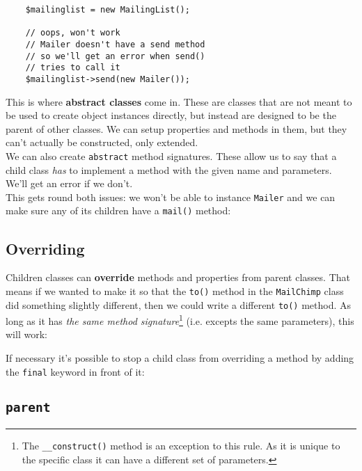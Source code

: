 \begin{verbatim}
    $mailinglist = new MailingList();

    // oops, won't work
    // Mailer doesn't have a send method
    // so we'll get an error when send()
    // tries to call it
    $mailinglist->send(new Mailer());
\end{verbatim}


This is where \textbf{abstract classes} come in. These are classes that are not meant to be used to create object instances directly, but instead are designed to be the parent of other classes. We can setup properties and methods in them, but they can't actually be constructed, only extended.
\\

We can also create \texttt{abstract} method signatures. These allow us to say that a child class \textit{has} to implement a method with the given name and parameters. We'll get an error if we don't.
\\

This gets round both issues: we won't be able to instance \texttt{Mailer} and we can make sure any of its children have a \texttt{mail()} method:



\subsection{Overriding}

Children classes can \textbf{override} methods and properties from parent classes. That means if we wanted to make it so that the \texttt{to()} method in the \texttt{MailChimp} class did something slightly different, then we could write a different \texttt{to()} method. As long as it has \textit{the same method signature}\footnote{The \texttt{\_\_construct()} method is an exception to this rule. As it is unique to the specific class it can have a different set of parameters.} (i.e. excepts the same parameters), this will work:

\pagebreak


If necessary it's possible to stop a child class from overriding a method by adding the \texttt{final} keyword in front of it:



\subsection{\texttt{parent}}

